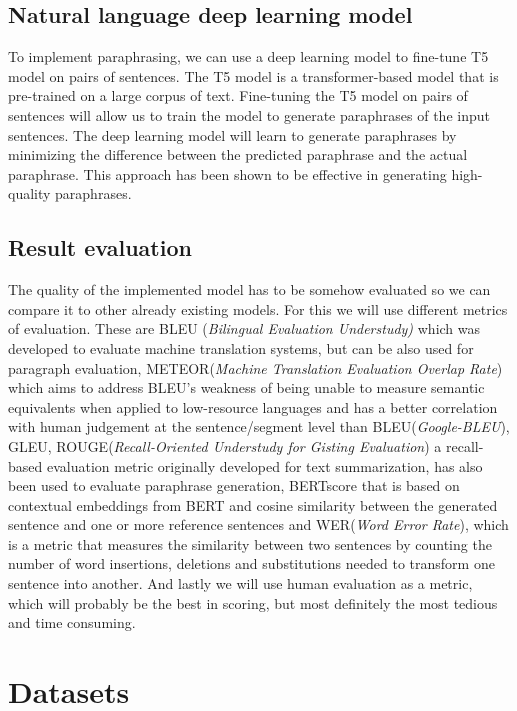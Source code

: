 \documentclass[fleqn,moreauthors,10pt]{ds_report}
\begin{document}
\subsection{Natural language deep learning model}
To implement paraphrasing, we can use a deep learning model to fine-tune T5 model on pairs of sentences. The T5 model is a transformer-based model that is pre-trained on a large corpus of text. Fine-tuning the T5 model on pairs of sentences will allow us to train the model to generate paraphrases of the input sentences. The deep learning model will learn to generate paraphrases by minimizing the difference between the predicted paraphrase and the actual paraphrase. This approach has been shown to be effective in generating high-quality paraphrases.

\subsection{Result evaluation}
The quality of the implemented model has to be somehow evaluated so we can compare it to other already existing models. For this we will use different metrics of evaluation. These are BLEU (\textit{Bilingual Evaluation Understudy)} which was developed to evaluate machine translation systems, but can be also used for paragraph evaluation, METEOR(\textit{Machine Translation Evaluation Overlap Rate}) which aims to address BLEU's weakness of being unable to measure semantic equivalents when applied to low-resource languages and has a better correlation with human judgement at the sentence/segment level than BLEU(\textit{Google-BLEU}), GLEU, ROUGE(\textit{Recall-Oriented Understudy for Gisting Evaluation}) a recall-based evaluation metric originally developed for text summarization, has also been used to evaluate paraphrase generation, BERTscore that is based on contextual embeddings from BERT and cosine similarity between the generated sentence and one or more reference sentences and WER(\textit{Word Error Rate}), which is a metric that measures the similarity between two sentences by counting the number of word insertions, deletions and substitutions needed to transform one sentence into another\cite{zhou2021paraphrase}. And lastly we will use human evaluation as a metric, which will probably be the best in scoring, but most definitely the most tedious and time consuming.

\section{Datasets}
\end{document}
